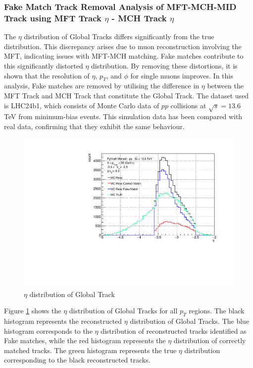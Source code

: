         \subsubsection{Fake Match Track Removal Analysis of MFT-MCH-MID Track using MFT Track $\eta$ - MCH Track $\eta$}
        \label{Analysis:Matching}
            The \(\eta\) distribution of Global Tracks differs significantly from the true distribution. This discrepancy arises due to muon reconstruction involving the MFT, indicating issues with MFT-MCH matching. Fake matches contribute to this significantly distorted \(\eta\) distribution. By removing these distortions, it is shown that the resolution of \(\eta\), \(p_T\), and \(\phi\) for single muons improves. In this analysis, Fake matches are removed by utilising the difference in \(\eta\) between the MFT Track and MCH Track that constitute the Global Track. The dataset used is LHC24b1, which consists of Monte Carlo data of \(pp\) collisions at \(\sqrt{s} = 13.6\) TeV from minimum-bias events. This simulation data has been compared with real data, confirming that they exhibit the same behaviour. %
            \begin{figure}[H]
                \centering
                \includegraphics[keepaspectratio, scale=0.5]{fig/3_5_6_etacutno_eta.pdf}
                \caption{$\eta$ distribution of Global Track}
                \label{Analysis:Matching:eta}
            \end{figure}
            Figure \ref{Analysis:Matching:eta} shows the \(\eta\) distribution of Global Tracks for all \(p_T\) regions. The black histogram represents the reconstructed \(\eta\) distribution of Global Tracks. The blue histogram corresponds to the \(\eta\) distribution of reconstructed tracks identified as Fake matches, while the red histogram represents the \(\eta\) distribution of correctly matched tracks. The green histogram represents the true \(\eta\) distribution corresponding to the black reconstructed tracks.  
